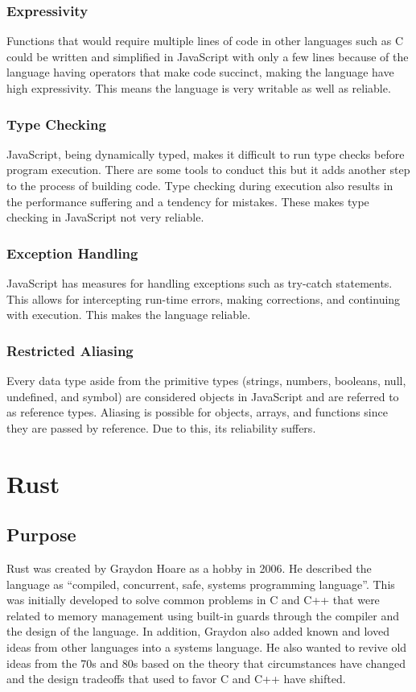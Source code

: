 \documentclass{article}
\begin{document}
  \subsubsection{Expressivity}
  Functions that would require multiple lines of code in other languages such as
  C could be written and simplified in JavaScript with only a few lines because
  of the language having operators that make code succinct, making the language
  have high expressivity. This means the language is very writable as well as
  reliable.

  \subsubsection{Type Checking}
  JavaScript, being dynamically typed, makes it difficult to run type checks
  before program execution. There are some tools to conduct this but it adds
  another step to the process of building code. Type checking during execution
  also results in the performance suffering and a tendency for mistakes. These
  makes type checking in JavaScript not very reliable.

  \subsubsection{Exception Handling}
  JavaScript has measures for handling exceptions such as try-catch statements.
  This allows for intercepting run-time errors, making corrections, and
  continuing with execution. This makes the language reliable.

  \subsubsection{Restricted Aliasing}
  Every data type aside from the primitive types (strings, numbers, booleans,
  null, undefined, and symbol) are considered objects in JavaScript and are
  referred to as reference types. Aliasing is possible for objects, arrays, and
  functions since they are passed by reference. Due to this, its reliability
  suffers.

  \section{Rust}

  \subsection{Purpose}
  Rust was created by Graydon Hoare as a hobby in 2006. He described the
  language as “compiled, concurrent, safe, systems programming language”. This
  was initially developed to solve common problems in C and C++ that were
  related to memory management using built-in guards through the compiler and
  the design of the language. In addition, Graydon also added known and loved
  ideas from other languages into a systems language. He also wanted to revive
  old ideas from the 70s and 80s based on the theory that circumstances have
  changed and the design tradeoffs that used to favor C and C++ have shifted.
\end{document}

